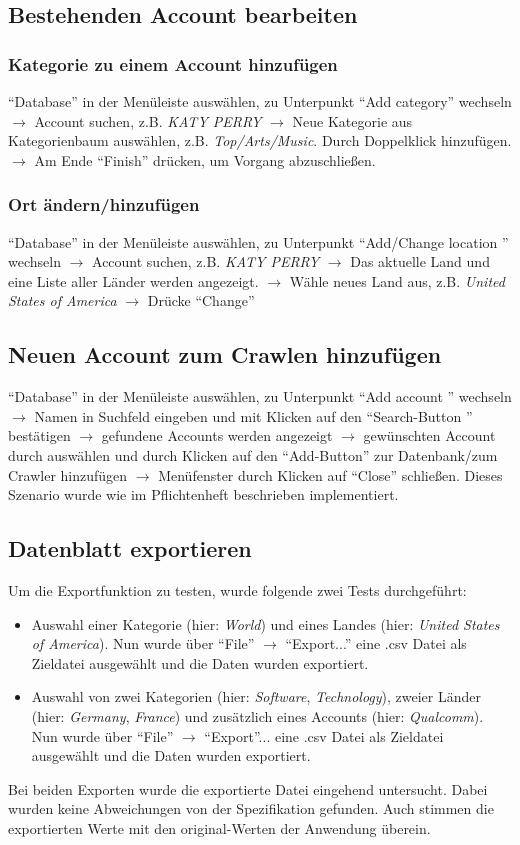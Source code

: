 \subsection{Bestehenden Account bearbeiten}

\subsubsection{Kategorie zu einem Account hinzufügen}
"`Database"' in der Menüleiste auswählen, zu Unterpunkt "`Add category"' wechseln $\to$ Account suchen,  z.B. \textit{KATY PERRY} $\to$ Neue Kategorie aus Kategorienbaum auswählen, z.B. \textit{Top/Arts/Music}. Durch Doppelklick hinzufügen. $\to$ Am Ende "`Finish"' drücken, um Vorgang abzuschließen.

\subsubsection{Ort ändern/hinzufügen}
"`Database"' in der Menüleiste auswählen, zu Unterpunkt "`Add/Change location "' wechseln $\to$ Account suchen,  z.B. \textit{KATY PERRY} $\to$ Das aktuelle Land und eine Liste aller Länder werden angezeigt. $\to$ Wähle neues Land aus, z.B. \textit{United States of America} $\to$ Drücke "`Change"'

\subsection{Neuen Account zum Crawlen hinzufügen}
"`Database"' in der Menüleiste auswählen, zu Unterpunkt "`Add account "' wechseln $\to$ Namen in Suchfeld eingeben und mit Klicken auf den "`Search-Button "' bestätigen $\to $ gefundene Accounts werden angezeigt $\to$ gewünschten Account durch auswählen und durch Klicken auf den "`Add-Button"' zur Datenbank/zum Crawler hinzufügen $\to$ Menüfenster durch Klicken auf "`Close"' schließen.
Dieses Szenario wurde wie im Pflichtenheft beschrieben implementiert.

\subsection{Datenblatt exportieren}
Um die Exportfunktion zu testen, wurde folgende zwei Tests durchgeführt:
\begin{itemize}
\item Auswahl einer Kategorie (hier: \textit{World}) und eines Landes (hier: \textit{United States of America}). Nun wurde über "`File"' $\to$ "`Export..."' eine .csv Datei als Zieldatei ausgewählt und die Daten wurden exportiert.
\item Auswahl von zwei Kategorien (hier: \textit{Software}, \textit{Technology}), zweier Länder (hier: \textit{Germany}, \textit{France}) und zusätzlich eines Accounts (hier: \textit{Qualcomm}). Nun wurde über "`File"' $\to$ "`Export"'... eine .csv Datei als Zieldatei ausgewählt und die Daten wurden exportiert.
\end{itemize}
Bei beiden Exporten wurde die exportierte Datei eingehend untersucht. Dabei wurden keine Abweichungen von der Spezifikation gefunden. Auch stimmen die exportierten Werte mit den original-Werten der Anwendung überein.
